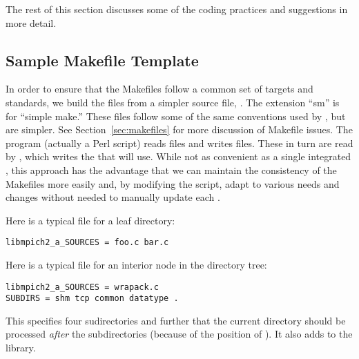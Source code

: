 \documentclass{article}
\begin{document}
The rest of this section discusses some of the coding practices and
suggestions in more detail.

\subsection{Sample Makefile Template}
\label{sec:makefile-template}

In order to ensure that the Makefiles follow a common set of targets and
standards, we build the  files from a simpler source file,
.  The extension ``sm'' is for ``simple make.''  These files
follow some of the same conventions used by , but are simpler.
See Section~\ref{sec:makefiles} for more discussion of Makefile issues.
The program (actually a Perl script)  reads
 files and writes  files.  These in turn
are read by , which writes the  that
 will use.  While not as convenient as a single integrated
, this approach has the advantage that we can maintain the
consistency of the Makefiles more easily and, by modifying the
 script, adapt to various needs and changes without needed to
manually update each .

Here is a typical  file for a leaf directory:
\begin{verbatim}
libmpich2_a_SOURCES = foo.c bar.c
\end{verbatim}

Here is a typical  file for an interior node in the
directory tree:
\begin{verbatim}
libmpich2_a_SOURCES = wrapack.c 
SUBDIRS = shm tcp common datatype .
\end{verbatim}
This specifies four sudirectories and further that the current directory
should be processed \emph{after} the subdirectories (because of the position
of ).  It also adds  to the  library.
\end{document}
